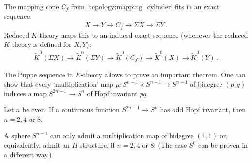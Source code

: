 {    \begin{property}
        The mapping cone $C_f$ from \cref{topology:mapping_cylinder} fits in an exact sequence:
        \begin{gather}
            X\longrightarrow Y\longrightarrow C_f\longrightarrow\Sigma X\longrightarrow\Sigma Y\,.
        \end{gather}
        Reduced $K$-theory maps this to an induced exact sequence (whenever the reduced $K$-theory is defined for $X,Y$):
        \begin{gather}
            \widetilde{K}^0(\Sigma X)\longrightarrow\widetilde{K}^0(\Sigma Y)\longrightarrow \widetilde{K}^0(C_f)\longrightarrow\widetilde{K}^0(X)\longrightarrow\widetilde{K}^0(Y)\,.
        \end{gather}
    \end{property}
    The Puppe sequence in $K$-theory allows to prove an important theorem.
     One can show that every `multiplication' map $\mu:S^{n-1}\times S^{n-1}\rightarrow S^{n-1}$ of bidegree $(p,q)$ induces a map $S^{2n-1}\rightarrow S^n$ of Hopf invariant $pq$.

     \begin{theorem}
         Let $n$ be even. If a continuous function $S^{2n-1}\rightarrow S^n$ has odd Hopf invariant, then $n=2,4$ or 8.
     \end{theorem}
     \begin{result}
         A sphere $S^{n-1}$ can only admit a multiplication map of bidegree $(1,1)$ or, equivalently, admit an $H$-structure, if $n=2,4$ or 8. (The case $S^0$ can be proven in a different way.)
     \end{result}

}
